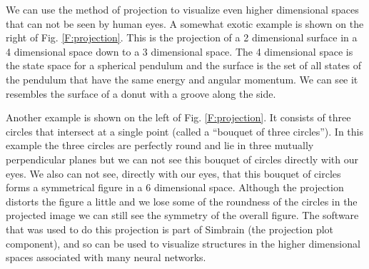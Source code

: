 
   We can use the method of projection to visualize even higher dimensional 
spaces that can not be seen by human eyes. A somewhat exotic example is shown 
on the right of Fig. \ref{F:projection}. This is the projection of a 2 
dimensional surface in a 4 dimensional space down to a 3 dimensional space. 
The 4 dimensional space is the state space for a spherical pendulum and the 
surface is the set of all states of the pendulum that have the same energy and 
angular momentum. We can see it resembles the surface of a donut with a groove
along the side. 

   Another example is shown on the left of Fig. \ref{F:projection}. It 
consists of three circles that intersect at a single point (called a ``bouquet 
of three circles''). In this example the three circles are perfectly round and 
lie in three mutually perpendicular planes but we can not see this bouquet of 
circles directly with our eyes. We also can not see, directly with our eyes, 
that this bouquet of circles forms a symmetrical figure in a 6 dimensional 
space. Although the projection distorts the figure a little and we lose some 
of the roundness of the circles in the projected image we can still see the 
symmetry of the overall figure. The software that was used to do this 
projection is part of Simbrain (the projection plot component), and so can be 
used to visualize structures in the higher dimensional spaces associated with 
many neural networks.

